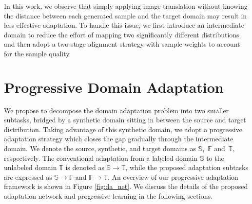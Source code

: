 \documentclass[10pt,twocolumn,letterpaper]{article}
\begin{document}
In this work, we observe that simply applying image translation without knowing the distance between each generated sample and the target domain may result in less effective adaptation.
To handle this issue, we first introduce an intermediate domain to reduce the effort of mapping two significantly different distributions and then adopt a two-stage 
alignment strategy with sample weights to account for the sample quality.



\section{Progressive Domain Adaptation}
We propose to decompose the domain adaptation problem into two smaller subtasks, bridged by a synthetic domain sitting in between the source and target distribution.
Taking advantage of this synthetic domain, we adopt a progressive adaptation strategy which closes the gap gradually through the intermediate domain.
We denote the source, synthetic, and target domains as $\mathbb{S}$,~$\mathbb{F}$ and~$\mathbb{T}$, respectively.
The conventional adaptation from a labeled domain $\mathbb{S}$ to the unlabeled domain $\mathbb{T}$ is denoted as $\mathbb{S} \rightarrow \mathbb{T}$,
while the proposed adaptation subtasks are expressed as $\mathbb{S} \rightarrow \mathbb{F}$ and $\mathbb{F} \rightarrow \mathbb{T}$.
An overview of our progressive adaptation framework is shown in Figure \ref{fig:da_net}.
We discuss the details of the proposed adaptation network and progressive learning in the following sections.
\end{document}
